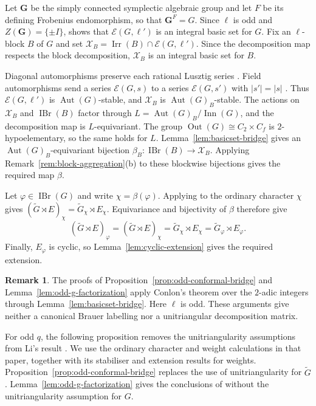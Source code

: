 \documentclass[10pt]{amsart}
\theoremstyle{definition}
\newtheorem{remark}[theorem]{Remark}
\let\oldendproof\endproof
\renewenvironment{proof}[1][\proofname]{%
  \oldproof[\bfseries #1]%
}{\oldendproof}
\DeclareMathOperator{\Aut}{Aut}
\DeclareMathOperator{\Out}{Out}
\DeclareMathOperator{\Inn}{Inn}
\DeclareMathOperator{\IBr}{IBr}
\DeclareMathOperator{\Irr}{Irr}
\numberwithin{equation}{section}
\numberwithin{table}{section}
\begin{document}
\begin{proof}
Let $\mathbf G$ be the simply connected symplectic algebraic group and let
$F$ be its defining Frobenius endomorphism, so that $\mathbf G^F=G$.
Since $\ell$ is odd and $Z(\mathbf G)=\{\pm I\}$,
\cite[Theorem~A]{Geck1993} shows that $\mathcal E(G,\ell')$ is an
integral basic set for $G$.
Fix an $\ell$-block $B$ of $G$ and set
$\mathcal X_B=\Irr(B)\cap\mathcal E(G,\ell')$.
Since the decomposition map respects the block decomposition, $\mathcal X_B$ is an
integral basic set for $B$.

Diagonal automorphisms preserve each rational Lusztig series
\cite[Proposition~15.6(i)]{CabanesEnguehard2004}. Field automorphisms
send a series $\mathcal E(G,s)$ to a series $\mathcal E(G,s')$ with
$|s'|=|s|$ \cite[Proposition~7.2]{Taylor2018Automorphisms}. Thus
$\mathcal E(G,\ell')$ is $\Aut(G)$-stable, and $\mathcal X_B$ is
$\Aut(G)_B$-stable.
The actions on $\mathcal X_B$ and $\IBr(B)$ factor through
$L=\Aut(G)_B/\Inn(G)$, and the decomposition map is $L$-equivariant.
The group $\Out(G)\cong C_2\times C_f$ is $2$-hypoelementary, so
the same holds for $L$.
Lemma~\ref{lem:basicset-bridge} gives an $\Aut(G)_B$-equivariant
bijection $\beta_B:\IBr(B)\longrightarrow\mathcal X_B$.
Applying Remark~\ref{rem:block-aggregation}\textup{(b)} to these blockwise
bijections gives the required map $\beta$.

Let $\varphi\in\IBr(G)$ and write $\chi=\beta(\varphi)$.
Applying \cite[Theorem~3.1]{CabanesSpath2017TypeC} to the ordinary
character $\chi$ gives
$(\widetilde G\rtimes E)_\chi=\widetilde G_\chi\rtimes E_\chi$.
Equivariance and bijectivity of $\beta$ therefore give
\[
  (\widetilde G\rtimes E)_\varphi
    =(\widetilde G\rtimes E)_\chi
    =\widetilde G_\chi\rtimes E_\chi
    =\widetilde G_\varphi\rtimes E_\varphi.
\]
Finally, $E_\varphi$ is cyclic, so Lemma~\ref{lem:cyclic-extension}
gives the required extension.
\end{proof}

\begin{remark}
The proofs of Proposition~\ref{prop:odd-conformal-bridge} and
Lemma~\ref{lem:odd-g-factorization} apply Conlon's theorem over the
$2$-adic integers through Lemma~\ref{lem:basicset-bridge}.  Here $\ell$ is odd.  These arguments give neither a canonical Brauer
labelling nor a unitriangular decomposition matrix.
\end{remark}

For odd $q$, the following proposition removes the unitriangularity
assumptions from Li's result \cite[Theorem~2]{Li2021}. We use the ordinary character
and weight calculations in that paper, together with its stabiliser
and extension results for weights. Proposition~\ref{prop:odd-conformal-bridge}
replaces the use of unitriangularity for $\widetilde G$.
Lemma~\ref{lem:odd-g-factorization} gives the conclusions of
\cite[Lemma~5.4]{Li2021} without the unitriangularity assumption for $G$.
\end{document}
